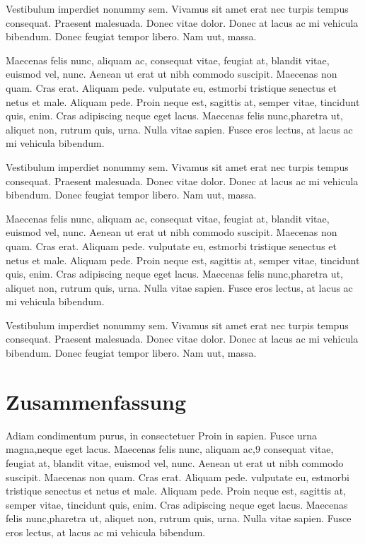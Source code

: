 \documentclass[a4paper,10pt,twocolumn]{scrartcl} %
\begin{document}
Vestibulum imperdiet nonummy sem. Vivamus sit amet erat nec turpis tempus consequat. Praesent malesuada. Donec vitae dolor. Donec at lacus ac mi vehicula bibendum. Donec feugiat tempor libero. Nam uut, massa.

Maecenas felis nunc, aliquam ac, consequat vitae, feugiat at, blandit vitae, euismod vel, nunc. Aenean ut erat ut nibh commodo suscipit. Maecenas non quam. Cras erat. Aliquam pede. vulputate eu, estmorbi tristique senectus et netus et male. Aliquam pede. Proin neque est, sagittis at, semper vitae, tincidunt quis, enim. Cras adipiscing neque eget lacus. Maecenas felis nunc,pharetra ut, aliquet non, rutrum quis, urna. Nulla vitae sapien. Fusce eros lectus, at lacus ac mi vehicula bibendum.

Vestibulum imperdiet nonummy sem. Vivamus sit amet erat nec turpis tempus consequat. Praesent malesuada. Donec vitae dolor. Donec at lacus ac mi vehicula bibendum. Donec feugiat tempor libero. Nam uut, massa.

Maecenas felis nunc, aliquam ac, consequat vitae, feugiat at, blandit vitae, euismod vel, nunc. Aenean ut erat ut nibh commodo suscipit. Maecenas non quam. Cras erat. Aliquam pede. vulputate eu, estmorbi tristique senectus et netus et male. Aliquam pede. Proin neque est, sagittis at, semper vitae, tincidunt quis, enim. Cras adipiscing neque eget lacus. Maecenas felis nunc,pharetra ut, aliquet non, rutrum quis, urna. Nulla vitae sapien. Fusce eros lectus, at lacus ac mi vehicula bibendum.

Vestibulum imperdiet nonummy sem. Vivamus sit amet erat nec turpis tempus consequat. Praesent malesuada. Donec vitae dolor. Donec at lacus ac mi vehicula bibendum. Donec feugiat tempor libero. Nam uut, massa.

\section{Zusammenfassung}
Adiam condimentum purus, in consectetuer Proin in sapien. Fusce urna magna,neque eget lacus. Maecenas felis nunc, aliquam ac,9 consequat vitae, feugiat at, blandit vitae, euismod vel, nunc. Aenean ut erat ut nibh commodo suscipit. Maecenas non quam. Cras erat. Aliquam pede. vulputate eu, estmorbi tristique senectus et netus et male. Aliquam pede. Proin neque est, sagittis at, semper vitae, tincidunt quis, enim. Cras adipiscing neque eget lacus. Maecenas felis nunc,pharetra ut, aliquet non, rutrum quis, urna. Nulla vitae sapien. Fusce eros lectus, at lacus ac mi vehicula bibendum\cite{j}.
\end{document}

